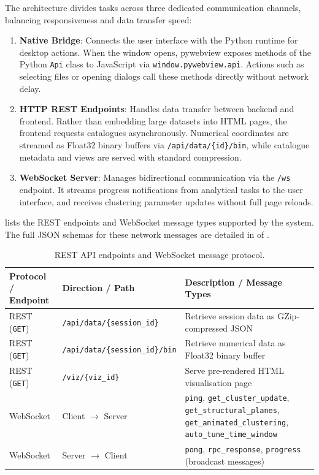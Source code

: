 The architecture divides tasks across three dedicated communication channels, balancing responsiveness and data transfer speed:
\begin{enumerate}
    \item \textbf{Native Bridge}: Connects the user interface with the Python runtime for desktop actions. When the window opens, pywebview exposes methods of the Python \texttt{Api} class to JavaScript via \texttt{window.pywebview.api}. Actions such as selecting files or opening dialogs call these methods directly without network delay.
    \item \textbf{HTTP REST Endpoints}: Handles data transfer between backend and frontend. Rather than embedding large datasets into HTML pages, the frontend requests catalogues asynchronously. Numerical coordinates are streamed as Float32 binary buffers via \texttt{/api/data/\{id\}/bin}, while catalogue metadata and views are served with standard compression.
    \item \textbf{WebSocket Server}: Manages bidirectional communication via the \texttt{/ws} endpoint. It streams progress notifications from analytical tasks to the user interface, and receives clustering parameter updates without full page reloads.
\end{enumerate}
 lists the REST endpoints and WebSocket message types supported by the system. The full JSON schemas for these network messages are detailed in  of .

\begin{table}[htbp]
\centering
\caption{REST API endpoints and WebSocket message protocol.}
\label{tab:rest-api}
\footnotesize
\renewcommand{\arraystretch}{1.1}
\begin{tabularx}{\textwidth}{@{}l l >{\raggedright\arraybackslash}X@{}}
\toprule
\textbf{Protocol / Endpoint} & \textbf{Direction / Path} & \textbf{Description / Message Types} \\
\midrule
REST (\texttt{GET}) & \texttt{/api/data/\{session\_id\}} & Retrieve session data as GZip-compressed JSON \\
REST (\texttt{GET}) & \texttt{/api/data/\{session\_id\}/bin} & Retrieve numerical data as Float32 binary buffer \\
REST (\texttt{GET}) & \texttt{/viz/\{viz\_id\}} & Serve pre-rendered HTML visualisation page \\
\midrule
WebSocket & Client $\to$ Server & \texttt{ping}, \texttt{get\_cluster\_update}, \texttt{get\_structural\_planes}, \texttt{get\_animated\_clustering}, \texttt{auto\_tune\_time\_window} \\
WebSocket & Server $\to$ Client & \texttt{pong}, \texttt{rpc\_response}, \texttt{progress} (broadcast messages) \\
\bottomrule
\end{tabularx}
\end{table}

